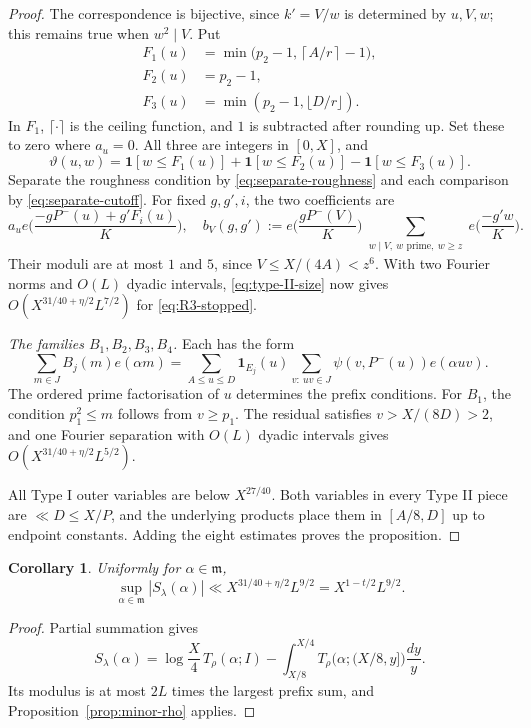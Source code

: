 \documentclass{amsart}
\newtheorem{corollary}[lemma]{Corollary}
\newcounter{fact}
\numberwithin{equation}{section}
\numberwithin{table}{section}
\newcommand{\ind}{\mathbf 1}
\newcommand{\m}{\mathfrak m}
\begin{document}
\begin{proof}
The correspondence is bijective, since $k'=V/w$ is determined by $u,V,w$;
this remains true when $w^2\mid V$. Put
\begin{align*}
F_1(u)&=\min\bigl(p_2-1,\left\lceil A/r\right\rceil-1\bigr),\\
F_2(u)&=p_2-1,\\
F_3(u)&=\min(p_2-1,\lfloor D/r\rfloor).
\end{align*}
In $F_1$, $\lceil\cdot\rceil$ is the ceiling function, and $1$ is subtracted after rounding up.
Set these to zero where $a_u=0$. All three are integers in $[0,X]$, and
\begin{equation}\label{eq:R3-cutoffs}
\vartheta(u,w)=\ind[w\le F_1(u)]+\ind[w\le F_2(u)]
-\ind[w\le F_3(u)].
\end{equation}
Separate the roughness condition by \eqref{eq:separate-roughness} and
each comparison by \eqref{eq:separate-cutoff}.
For fixed $g,g',i$, the two coefficients are
\[
a_u e\Big(\frac{-gP^-(u)+g'F_i(u)}K\Big),\quad
b_V(g,g'):=e\Big(\frac{gP^-(V)}K\Big)
\sum_{\substack{w\mid V,\ w\text{ prime},\ w\ge z}}
e\Big(\frac{-g'w}K\Big).
\]
Their moduli are at most $1$ and $5$, since $V\le X/(4A)<z^6$.
With two Fourier norms and $O(L)$ dyadic intervals,
\eqref{eq:type-II-size} now gives
$O(X^{31/40+\eta/2}L^{7/2})$ for \eqref{eq:R3-stopped}.

\noindent\textit{The families $B_1,B_2,B_3,B_4$.}
Each has the form
\[
\sum_{m\in J}B_j(m)e(\alpha m)
=\sum_{A\le u\le D}\ind_{E_j}(u)
\sum_{v:\ uv\in J}\psi(v,P^-(u))e(\alpha uv).
\]
The ordered prime factorisation of $u$ determines the prefix conditions.
For $B_1$, the condition $p_1^2\le m$ follows from $v\ge p_1$.
The residual satisfies $v>X/(8D)>2$, and one Fourier separation with
$O(L)$ dyadic intervals gives
$O(X^{31/40+\eta/2}L^{5/2})$.

All Type I outer variables are below $X^{27/40}$.
Both variables in every Type II piece are $\ll D\le X/P$, and the
underlying products place them in $[A/8,D]$ up to endpoint constants.
Adding the eight estimates proves the proposition.
\end{proof}

\begin{corollary}\label{cor:minor-lambda}
Uniformly for $\alpha\in\m$,
\[
\sup_{\alpha\in\m}|S_\lambda(\alpha)|
\ll X^{31/40+\eta/2}L^{9/2}=X^{1-t/2}L^{9/2}.
\]
\end{corollary}

\begin{proof}
Partial summation gives
\[
S_\lambda(\alpha)=\log\frac X4\,T_\rho(\alpha;I)
-\int_{X/8}^{X/4}T_\rho\big(\alpha;(X/8,y]\big)\frac{dy}y.
\]
Its modulus is at most $2L$ times the largest prefix sum, and
Proposition~\ref{prop:minor-rho} applies.
\end{proof}
\end{document}
